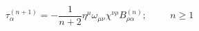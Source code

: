 \begin{equation}
 \tau_\alpha ^{(n+1)}=-\frac{1}{n+2} \eta^\mu
 \omega_{\mu\nu}\chi^{\nu\rho}B_{\rho\alpha}^{(n)}; \hspace {1cm}n\geq1
 \label{a13}
 \end{equation}

